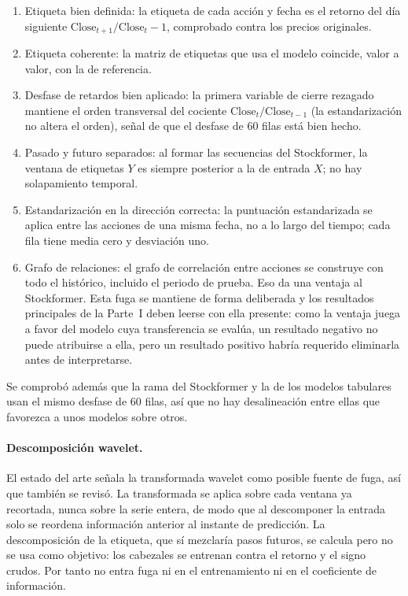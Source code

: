 \begin{enumerate}
  \item Etiqueta bien definida: la etiqueta de cada acción y fecha es el retorno del día
        siguiente \(\text{Close}_{t+1}/\text{Close}_t-1\), comprobado contra los precios
        originales.
  \item Etiqueta coherente: la matriz de etiquetas que usa el modelo coincide, valor a
        valor, con la de referencia.
  \item Desfase de retardos bien aplicado: la primera variable de cierre rezagado mantiene
        el orden transversal del cociente \(\text{Close}_t/\text{Close}_{t-1}\) (la
        estandarización no altera el orden), señal de que el desfase de 60 filas está bien
        hecho.
  \item Pasado y futuro separados: al formar las secuencias del Stockformer, la ventana de
        etiquetas \(Y\) es siempre posterior a la de entrada \(X\); no hay solapamiento
        temporal.
  \item Estandarización en la dirección correcta: la puntuación estandarizada se aplica
        entre las acciones de una misma fecha, no a lo largo del tiempo; cada fila tiene
        media cero y desviación uno.
  \item Grafo de relaciones: el grafo de correlación entre acciones se construye con todo
        el histórico, incluido el periodo de prueba. Eso da una ventaja al Stockformer.
        Esta fuga se mantiene de forma deliberada y los resultados principales de la
        Parte~I deben leerse con ella presente: como la ventaja juega a favor del modelo
        cuya transferencia se evalúa, un resultado negativo no puede atribuirse a ella,
        pero un resultado positivo habría requerido eliminarla antes de interpretarse.
\end{enumerate}

Se comprobó además que la rama del Stockformer y la de los modelos tabulares usan el mismo
desfase de 60 filas, así que no hay desalineación entre ellas que favorezca a unos modelos
sobre otros.

\paragraph{Descomposición wavelet.} El estado del arte señala la transformada wavelet como
posible fuente de fuga, así que también se revisó. La transformada se aplica sobre cada
ventana ya recortada, nunca sobre la serie entera, de modo que al descomponer la entrada
solo se reordena información anterior al instante de predicción. La descomposición de la
etiqueta, que sí mezclaría pasos futuros, se calcula pero no se usa como objetivo: los
cabezales se entrenan contra el retorno y el signo crudos. Por tanto no entra fuga ni en
el entrenamiento ni en el coeficiente de información.
